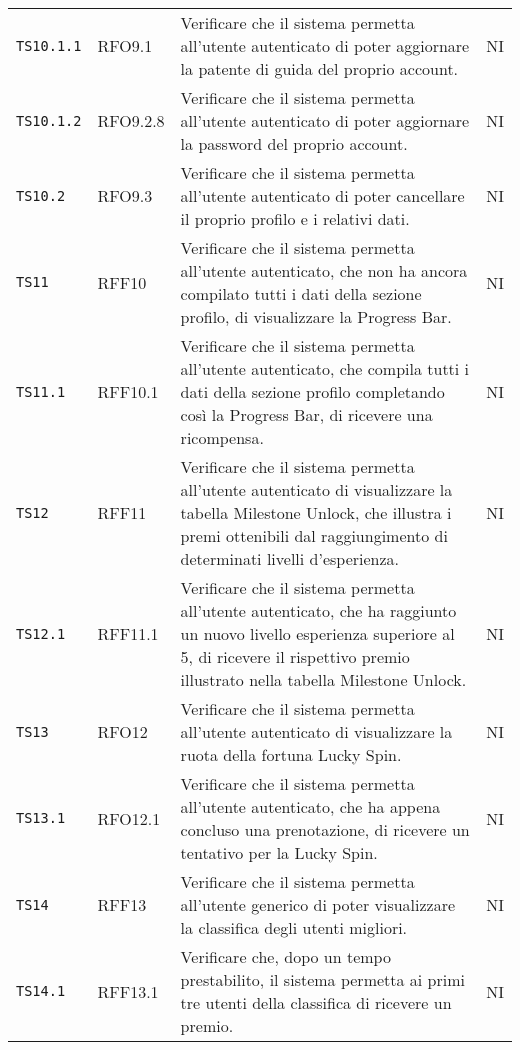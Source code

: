 \begin{longtable}{ >{\centering}p{} >{\centering}p{} >{\centering}p{}
			>{\centering}p{}}
		 \texttt{TS10.1.1}	& RFO9.1 & Verificare che il sistema permetta all'utente autenticato di poter aggiornare la patente di guida del proprio account. 	&	NI	\tabularnewline
		 
		\texttt{TS10.1.2}	& RFO9.2.8 &	Verificare che il sistema permetta all'utente autenticato di poter aggiornare la password del proprio account. 	&	NI	\tabularnewline 
		
		\texttt{TS10.2} & RFO9.3 	&	Verificare che il sistema permetta all'utente autenticato di poter cancellare il proprio profilo e i relativi dati. 	&	NI	\tabularnewline
		
		 \texttt{TS11} & RFF10	&	Verificare che il sistema permetta all'utente autenticato, che non ha ancora compilato tutti i dati della sezione profilo, di visualizzare la Progress Bar. 	&	NI	\tabularnewline
		 
		 \texttt{TS11.1}	& RFF10.1 & Verificare che il sistema permetta all'utente autenticato, che compila tutti i dati della sezione profilo completando così la Progress Bar, di ricevere una ricompensa. 	&	NI	\tabularnewline
		 
		 \texttt{TS12}	& RFF11 &	Verificare che il sistema permetta all'utente autenticato di visualizzare la tabella Milestone Unlock\glo, che illustra i premi ottenibili dal raggiungimento di determinati livelli d'esperienza. 	&	NI	\tabularnewline	
		 	 
		 \texttt{TS12.1}	& RFF11.1 &	Verificare che il sistema permetta all'utente autenticato, che ha raggiunto un nuovo livello esperienza superiore al 5, di ricevere il rispettivo premio illustrato nella tabella Milestone Unlock\glo. 	&	NI	\tabularnewline
		 
		 \texttt{TS13} & RFO12 &	Verificare che il sistema permetta all'utente autenticato di visualizzare la ruota della fortuna Lucky Spin\glo. 	&	NI	\tabularnewline		
		  
		 \texttt{TS13.1}	& RFO12.1 &	Verificare che il sistema permetta all'utente autenticato, che ha appena concluso una prenotazione, di ricevere un tentativo per la Lucky Spin\glo. 	&	NI	\tabularnewline	
		 
		  \texttt{TS14}	& RFF13 &	Verificare che il sistema permetta all'utente generico di poter visualizzare la classifica degli utenti migliori. 	&	NI	\tabularnewline	
		  
		 \texttt{TS14.1}	& RFF13.1 & Verificare che, dopo un tempo prestabilito, il sistema permetta ai primi tre utenti della classifica di ricevere un premio.	&	NI	\tabularnewline	
		 

\end{longtable}

